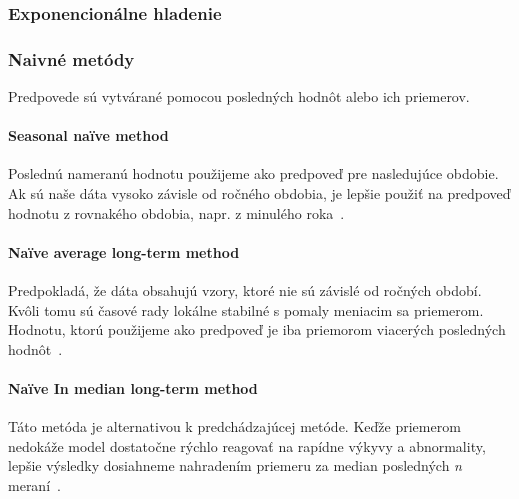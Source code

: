\documentclass[a4paper,slovak,12pt,appendix]{article}
\begin{document}

\subsubsection{Exponencionálne hladenie}


\subsubsection{Naivné metódy}
Predpovede sú vytvárané pomocou posledných hodnôt alebo ich priemerov.

\paragraph{Seasonal naïve method}
Poslednú nameranú hodnotu použijeme ako predpoveď pre nasledujúce obdobie. Ak
sú naše dáta vysoko závisle od ročného obdobia, je lepšie použiť na predpoveď
hodnotu z rovnakého obdobia, napr. z minulého roka~\cite{Grmanova2016}.

\paragraph{Naïve average long-term method}
Predpokladá, že dáta obsahujú vzory, ktoré nie sú závislé od ročných období.
Kvôli tomu sú časové rady lokálne stabilné s pomaly meniacim sa priemerom.
Hodnotu, ktorú použijeme ako predpoveď je iba priemorom viacerých posledných
hodnôt~\cite{Grmanova2016}.

\paragraph{Naïve In median long-term method}
Táto metóda je alternativou k predchádzajúcej metóde. Keďže priemerom nedokáže
model dostatočne rýchlo reagovať na rapídne výkyvy a abnormality, lepšie
výsledky dosiahneme nahradením priemeru za median posledných \textit{n}
meraní~\cite{Grmanova2016}.

\end{document}
